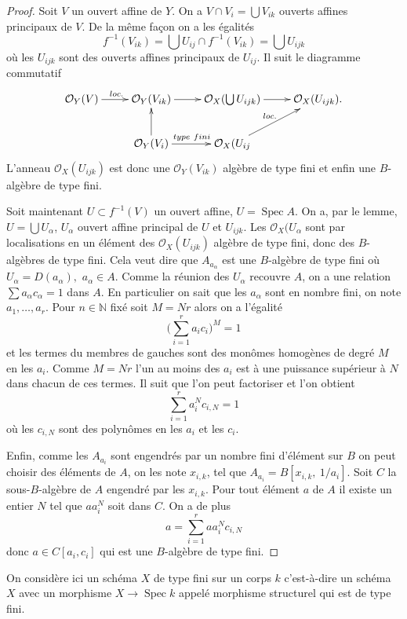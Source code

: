 \documentclass[A4, 11pt]{article}
\def\N{{\mathbb N}}
\begin{document}
\begin{proof}
Soit $V$ un ouvert affine de $Y$. On a $V\cap V_i= \bigcup V_{ik}$ ouverts affines principaux de $V$. De la même façon on a les égalités 
$$f^{-1}(V_{ik})=\bigcup U_{ij}\cap f^{-1}(V_{ik})=\bigcup U_{ijk}$$
où les $U_{ijk}$ sont des ouverts affines principaux de $U_{ij}$. Il suit le diagramme commutatif
$$\xymatrix{
\mathcal{O}_Y(V) \ar[r]^{loc.} &  \mathcal{O}_Y(V_{ik}) \ar[r] & \mathcal{O}_X (\bigcup U_{ijk}) \ar[r] & \mathcal{O}_X(U_{ijk}) . \\
 & \mathcal{O}_Y(V_i) \ar[u] \ar[r]^{type~fini}  & \mathcal{O}_X(U_{ij} \ar[ur]^{loc.} & \\
}$$
L'anneau $\mathcal{O}_X(U_{ijk})$ est donc une $\mathcal{O}_Y(V_{ik})$ algèbre de type fini et enfin une $B$-algèbre de type fini. 

Soit maintenant $U\subset f^{-1}(V)$ un ouvert affine, $U=\operatorname{Spec} A$. On a, par le lemme, $U=\bigcup U_{\alpha}$, $U_{\alpha}$ ouvert affine principal de $U$ et $U_{ijk}$. Les $\mathcal{O}_X(U_{\alpha}$ sont par localisations en un élément des $\mathcal{O}_X(U_{ijk})$ algèbre de type fini, donc des $B$-algèbres de type fini. Cela veut dire que $A_{a_{\alpha}}$ est une $B$-algèbre de type fini où $U_{\alpha}=D(a_{\alpha}),$ $a_{\alpha}\in A$. Comme la réunion des $U_{\alpha}$ recouvre $A$, on a une relation $\sum a_{\alpha} c_{\alpha}=1$ dans $A$.  En particulier on sait que les $a_{\alpha}$ sont en nombre fini, on note $a_1,\dots ,a_r$. Pour $n\in \N$ fixé soit $M=Nr$ alors on a l'égalité
$$\big ( \sum\limits_{i=1}^r a_i c_i)^M=1$$
et les termes du membres de gauches sont des monômes homogènes de degré $M$ en les $a_i$. Comme $M=Nr$ l'un au moins des $a_i$ est à une puissance supérieur à $N$ dans chacun de ces termes. Il suit que l'on peut factoriser et l'on obtient 
$$\sum\limits_{i=1}^r a_i^Nc_{i,N}=1$$
où les $c_{i,N}$ sont des polynômes en les $a_i$ et les $c_i$. 

Enfin, comme les $A_{a_i}$ sont engendrés par un nombre fini d'élément sur $B$ on peut choisir des éléments de $A$, on les note $x_{i,k}$, tel que $A_{a_i}=B[x_{i,k}, ~ 1/a_i]$. Soit $C$ la sous-$B$-algèbre de $A$ engendré par les $x_{i,k}$. Pour tout élément $a$ de $A$ il existe un entier $N$ tel que $a a_i^N$ soit dans $C$. On a de plus
$$a=\sum\limits_{i=1}^r a a_i^N c_{i,N}$$
donc $a\in C[a_i, c_i]$ qui est une $B$-algèbre de type fini.  
\end{proof}

On considère ici un schéma $X$ de type fini sur un corps $k$ c'est-à-dire un schéma $X$ avec un morphisme $X\rightarrow \operatorname{Spec} k$ appelé morphisme structurel qui est de type fini. 
\end{document}
